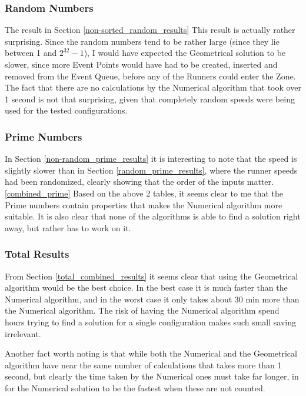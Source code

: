 \subsubsection{Random Numbers}
The result in Section \ref{non-sorted_random_results} This result is actually rather surprising. Since the random numbers tend to be rather large (since they lie between 1 and $2^{32} - 1$), I would have expected the Geometrical solution to be slower, since more Event Points would have had to be created, inserted and removed from the Event Queue, before any of the Runners could enter the Zone. The fact that there are no calculations by the Numerical algorithm that took over 1 second is not that surprising, given that completely random speeds were being used for the tested configurations.\\

\subsubsection{Prime Numbers}

In Section \ref{non-random_prime_results} it is interesting to note that the speed is slightly slower than in Section \ref{random_prime_results}, where the runner speeds had been randomized, clearly showing that the order of the inputs matter.\\

\ref{combined_prime}
Based on the above 2 tables, it seems clear to me that the Prime numbers contain properties that makes the Numerical algorithm more suitable. It is also clear that none of the algorithms is able to find a solution right away, but rather has to work on it. 


\subsubsection{Total Results}
From Section \ref{total_combined_results} it seems clear that using the Geometrical algorithm would be the best choice. In the best case it is much faster than the Numerical algorithm, and in the worst case it only takes about 30 min more than the Numerical algorithm. The risk of having the Numerical algorithm spend hours trying to find a solution for a single configuration makes such small saving irrelevant.  

Another fact worth noting is that while both the Numerical and the Geometrical algorithm have near the same number of calculations that takes more than 1 second, but clearly the time taken by the Numerical ones must take far longer, in for the Numerical solution to be the fastest when these are not counted.

